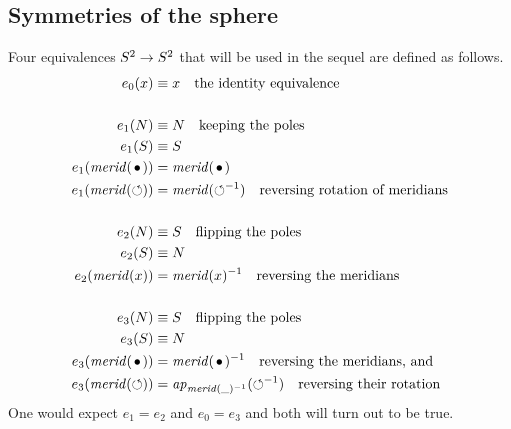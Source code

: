 \documentclass[english,a4]{article}
\begin{document}






\subsection{Symmetries of the sphere}
\label{sec:symmetries-sphere}

Four equivalences $S^2\to S^2$ that will be used in the sequel are
defined as follows. 
\begin{align}
  \label{eq:S2symmetries}
  e_0(x)&\jdeq x \quad\text{the identity equivalence}\\
\nonumber\\
  e_1(N)&\jdeq N \quad\text{keeping the poles}\\
  e_1(S)&\jdeq S\\
  e_1(\mrd(\base))&= \mrd(\base)\\
  e_1(\mrd(\Sloop))&= \mrd(\Sloop^{-1})\quad\text{reversing rotation of meridians}\\
\nonumber\\
  e_2(N)&\jdeq S \quad\text{flipping the poles}\\
  e_2(S)&\jdeq N\\
  e_2(\mrd(x))&= \mrd(x)^{-1}\quad\text{reversing the meridians}\\
\nonumber\\
  e_3(N)&\jdeq S \quad\text{flipping the poles}\\
  e_3(S)&\jdeq N\\
  e_3(\mrd(\base))&= \mrd(\base)^{-1}\quad\text{reversing the meridians, and}\\
  e_3(\mrd(\Sloop))&= \ap{\mrd(\_)^{-1}}(\Sloop^{-1})\quad\text{reversing their rotation}
\end{align}
One would expect $e_1=e_2$ and $e_0=e_3$ and both will turn out to be true.
\end{document}
